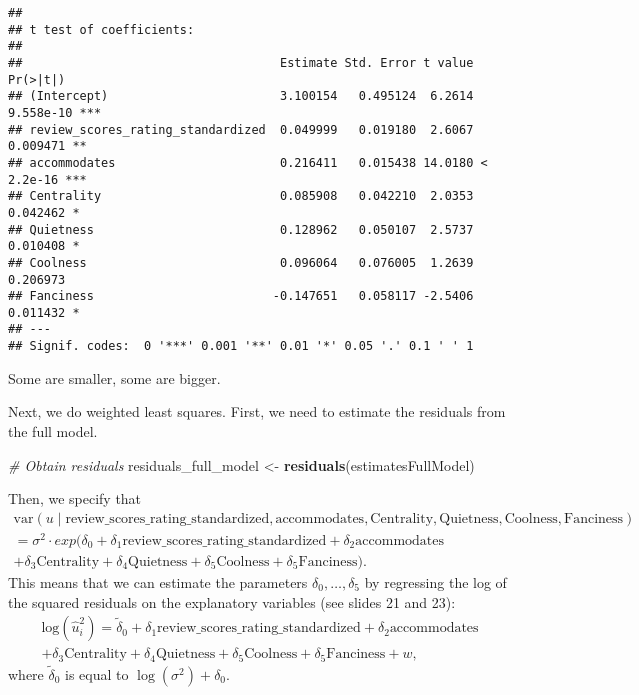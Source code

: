 \documentclass[
]{article}
\newenvironment{Shaded}{\begin{snugshade}}{\end{snugshade}}
\newcommand{\CommentTok}[1]{\textcolor[rgb]{0.56,0.35,0.01}{\textit{#1}}}
\newcommand{\FunctionTok}[1]{\textcolor[rgb]{0.13,0.29,0.53}{\textbf{#1}}}
\newcommand{\NormalTok}[1]{#1}
\newcommand{\OtherTok}[1]{\textcolor[rgb]{0.56,0.35,0.01}{#1}}
\begin{document}
\begin{verbatim}
## 
## t test of coefficients:
## 
##                                    Estimate Std. Error t value  Pr(>|t|)    
## (Intercept)                        3.100154   0.495124  6.2614 9.558e-10 ***
## review_scores_rating_standardized  0.049999   0.019180  2.6067  0.009471 ** 
## accommodates                       0.216411   0.015438 14.0180 < 2.2e-16 ***
## Centrality                         0.085908   0.042210  2.0353  0.042462 *  
## Quietness                          0.128962   0.050107  2.5737  0.010408 *  
## Coolness                           0.096064   0.076005  1.2639  0.206973    
## Fanciness                         -0.147651   0.058117 -2.5406  0.011432 *  
## ---
## Signif. codes:  0 '***' 0.001 '**' 0.01 '*' 0.05 '.' 0.1 ' ' 1
\end{verbatim}

Some are smaller, some are bigger.

Next, we do weighted least squares. First, we need to estimate the
residuals from the full model.

\begin{Shaded}
\begin{Highlighting}[]
\CommentTok{\# Obtain residuals}
\NormalTok{residuals\_full\_model }\OtherTok{\textless{}{-}} \FunctionTok{residuals}\NormalTok{(estimatesFullModel)}
\end{Highlighting}
\end{Shaded}

Then, we specify that \[
\begin{align*}
\text{var}(u \mid \text{review_scores_rating_standardized}, \text{accommodates}, \text{Centrality}, \text{Quietness}, \text{Coolness}, \text{Fanciness}) \\
= \sigma^2 \cdot exp(\delta_0 + \delta_1 \text{review_scores_rating_standardized} + \delta_2 \text{accommodates} \\ + \delta_3 \text{Centrality} + \delta_4 \text{Quietness} + \delta_5 \text{Coolness} + \delta_5 \text{Fanciness}).
\end{align*}
\] This means that we can estimate the parameters
\(\delta_0, \ldots, \delta_5\) by regressing the log of the squared
residuals on the explanatory variables (see slides 21 and 23): \[
\begin{align*}
\text{log}(\hat u_i^2) = \tilde \delta_0 + \delta_1 \text{review_scores_rating_standardized} + \delta_2 \text{accommodates} \\ + \delta_3 \text{Centrality} + \delta_4 \text{Quietness} + \delta_5 \text{Coolness} + \delta_5 \text{Fanciness} + w,
\end{align*}
\] where \(\tilde \delta_0\) is equal to \(\log(\sigma^2) + \delta_0\).
\end{document}
